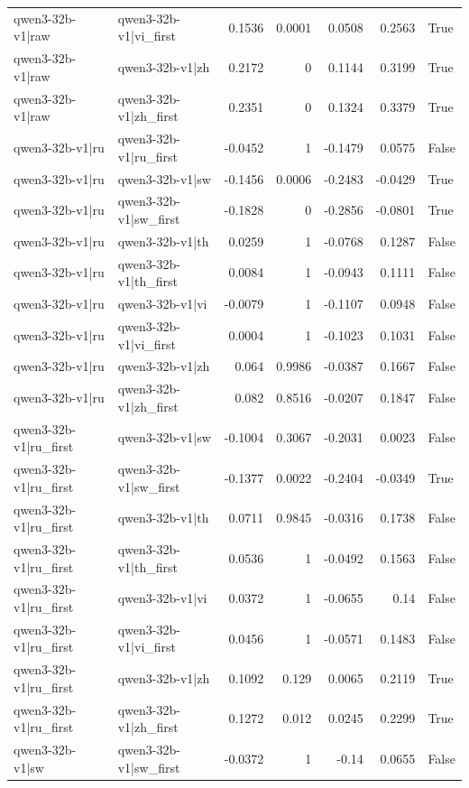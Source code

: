\begin{table}
\begin{tabular}{l l r r r r l}
qwen3-32b-v1|raw & qwen3-32b-v1|vi_first & 0.1536 & 0.0001 & 0.0508 & 0.2563 & True \\
qwen3-32b-v1|raw & qwen3-32b-v1|zh & 0.2172 & 0 & 0.1144 & 0.3199 & True \\
qwen3-32b-v1|raw & qwen3-32b-v1|zh_first & 0.2351 & 0 & 0.1324 & 0.3379 & True \\
qwen3-32b-v1|ru & qwen3-32b-v1|ru_first & -0.0452 & 1 & -0.1479 & 0.0575 & False \\
qwen3-32b-v1|ru & qwen3-32b-v1|sw & -0.1456 & 0.0006 & -0.2483 & -0.0429 & True \\
qwen3-32b-v1|ru & qwen3-32b-v1|sw_first & -0.1828 & 0 & -0.2856 & -0.0801 & True \\
qwen3-32b-v1|ru & qwen3-32b-v1|th & 0.0259 & 1 & -0.0768 & 0.1287 & False \\
qwen3-32b-v1|ru & qwen3-32b-v1|th_first & 0.0084 & 1 & -0.0943 & 0.1111 & False \\
qwen3-32b-v1|ru & qwen3-32b-v1|vi & -0.0079 & 1 & -0.1107 & 0.0948 & False \\
qwen3-32b-v1|ru & qwen3-32b-v1|vi_first & 0.0004 & 1 & -0.1023 & 0.1031 & False \\
qwen3-32b-v1|ru & qwen3-32b-v1|zh & 0.064 & 0.9986 & -0.0387 & 0.1667 & False \\
qwen3-32b-v1|ru & qwen3-32b-v1|zh_first & 0.082 & 0.8516 & -0.0207 & 0.1847 & False \\
qwen3-32b-v1|ru_first & qwen3-32b-v1|sw & -0.1004 & 0.3067 & -0.2031 & 0.0023 & False \\
qwen3-32b-v1|ru_first & qwen3-32b-v1|sw_first & -0.1377 & 0.0022 & -0.2404 & -0.0349 & True \\
qwen3-32b-v1|ru_first & qwen3-32b-v1|th & 0.0711 & 0.9845 & -0.0316 & 0.1738 & False \\
qwen3-32b-v1|ru_first & qwen3-32b-v1|th_first & 0.0536 & 1 & -0.0492 & 0.1563 & False \\
qwen3-32b-v1|ru_first & qwen3-32b-v1|vi & 0.0372 & 1 & -0.0655 & 0.14 & False \\
qwen3-32b-v1|ru_first & qwen3-32b-v1|vi_first & 0.0456 & 1 & -0.0571 & 0.1483 & False \\
qwen3-32b-v1|ru_first & qwen3-32b-v1|zh & 0.1092 & 0.129 & 0.0065 & 0.2119 & True \\
qwen3-32b-v1|ru_first & qwen3-32b-v1|zh_first & 0.1272 & 0.012 & 0.0245 & 0.2299 & True \\
qwen3-32b-v1|sw & qwen3-32b-v1|sw_first & -0.0372 & 1 & -0.14 & 0.0655 & False \\

\end{tabular}
\end{table}
